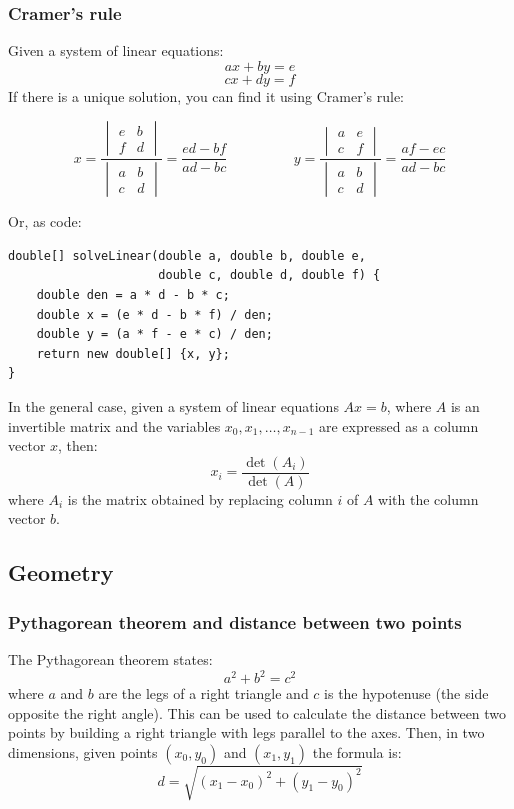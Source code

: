 \documentclass[a4paper,12pt]{article}
\begin{document}
\subsubsection{Cramer's rule}
Given a system of linear equations:
\[ax + by = e\]
\[cx + dy = f\]
\noindent If there is a unique solution, you can find it using Cramer's rule:

\[
x = \frac{\begin{vmatrix}e & b \\ f & d\end{vmatrix}}{\begin{vmatrix}a & b \\ c & d\end{vmatrix}} = \frac{ed-bf}{ad-bc}
\hspace{2cm}
y = \frac{\begin{vmatrix}a & e \\ c & f\end{vmatrix}}{\begin{vmatrix}a & b \\ c & d\end{vmatrix}} = \frac{af-ec}{ad-bc}
\]

\noindent Or, as code:

\begin{lstlisting}
double[] solveLinear(double a, double b, double e,
					 double c, double d, double f) {
	double den = a * d - b * c;
	double x = (e * d - b * f) / den;
	double y = (a * f - e * c) / den;
	return new double[] {x, y};
}
\end{lstlisting}

\noindent In the general case, given a system of linear equations $Ax=b$, where $A$ is an invertible matrix and the variables $x_0,x_1,\ldots,x_{n-1}$ are expressed as a column vector $x$, then:
\[x_i=\frac{\det(A_i)}{\det(A)}\]
\noindent where $A_i$ is the matrix obtained by replacing column $i$ of $A$ with the column vector $b$.
\subsection{Geometry}
\subsubsection{Pythagorean theorem and distance between two points}
\noindent The Pythagorean theorem states:
\[a^2+b^2=c^2\]
\noindent where $a$ and $b$ are the legs of a right triangle and $c$ is the hypotenuse (the side opposite the right angle). This can be used to calculate the distance between two points by building a right triangle with legs parallel to the axes. Then, in two dimensions, given points $(x_0, y_0)$ and $(x_1, y_1)$ the formula is:
\[ d = \sqrt{(x_1 - x_0)^2 + (y_1 - y_0)^2} \]
\end{document}
